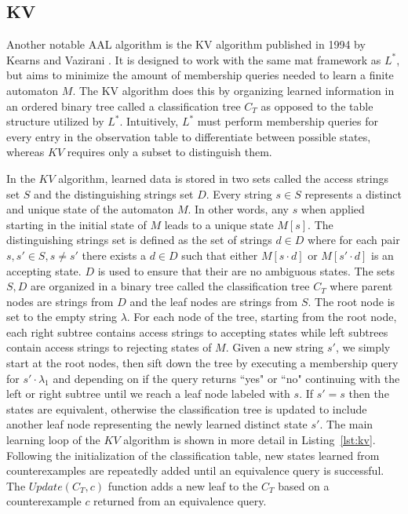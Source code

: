 \subsection{KV}
Another notable AAL algorithm is the KV algorithm published in 1994 by Kearns and Vazirani \cite{KV1994}. It is designed to work with the same \ac{mat} framework as $L^*$, but aims to minimize the amount of membership queries needed to learn a finite automaton $M$. The KV algorithm does this by organizing learned information in an ordered binary tree called a classification tree $C_T$ as opposed to the table structure utilized by $L^*$. Intuitively, $L^*$ must perform membership queries for every entry in the observation table to differentiate between possible states, whereas $KV$ requires only a subset to distinguish them. 

In the $KV$ algorithm, learned data is stored in two sets called the access strings set $S$ and the distinguishing strings set $D$. Every string $s \in S$ represents a distinct and unique state of the automaton $M$. In other words, any $s$ when applied starting in the initial state of $M$ leads to a unique state $M[s]$. The distinguishing strings set is defined as the set of strings $d \in D$ where for each pair $s,s' \in S, s \neq s'$ there exists a $d \in D$ such that either $M[s \cdot d]$ or $M[s' \cdot d]$ is an accepting state. $D$ is used to ensure that their are no ambiguous states. The sets $S,D$ are organized in a binary tree called the classification tree $C_T$ where parent nodes are strings from $D$ and the leaf nodes are strings from $S$. The root node is set to the empty string $\lambda$. For each node of the tree, starting from the root node, each right subtree contains access strings to accepting states while left subtrees contain access strings to rejecting states of $M$.
Given a new string $s'$, we simply start at the root nodes, then sift down the tree by executing a membership query for $s' \cdot \lambda_1$ and depending on if the query returns ``yes" or ``no" continuing with the left or right subtree until we reach a leaf node labeled with $s$. If $s' = s$ then the states are equivalent, otherwise the classification tree is updated to include another leaf node representing the newly learned distinct state $s'$. The main learning loop of the $KV$ algorithm is shown in more detail in Listing~\ref{lst:kv}. Following the initialization of the classification table, new states learned from counterexamples are repeatedly added until an equivalence query is successful. The $Update(C_T,c)$ function adds a new leaf to the $C_T$ based on a counterexample $c$ returned from an equivalence query.

